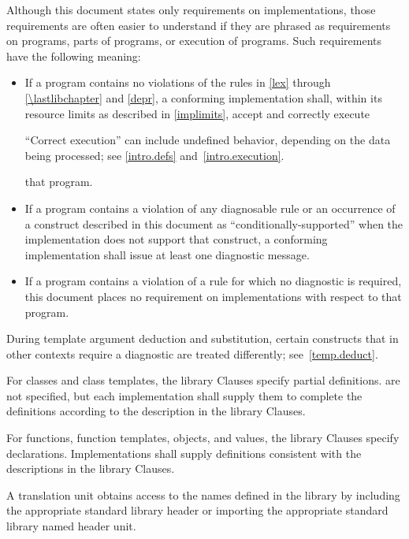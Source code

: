 \pnum
{}%
Although this document states only requirements on \Cpp{}
implementations, those requirements are often easier to understand if
they are phrased as requirements on programs, parts of programs, or
execution of programs. Such requirements have the following meaning:
\begin{itemize}
\item
If a program contains no violations of the rules in
\ref{lex} through \ref{\lastlibchapter} and \ref{depr},
a conforming implementation shall,
within its resource limits as described in \ref{implimits},
accept and correctly execute
\begin{footnote}
``Correct execution'' can include undefined behavior, depending on
the data being processed; see \ref{intro.defs} and~\ref{intro.execution}.
\end{footnote}
that program.
\item
{}%
If a program contains a violation of any diagnosable rule or an occurrence
of a construct described in this document as ``conditionally-supported'' when
the implementation does not support that construct, a conforming implementation
shall issue at least one diagnostic message.
\item
{}%
If a program contains a violation of a rule for which no diagnostic
is required, this document places no requirement on
implementations with respect to that program.
\end{itemize}
\begin{note}
During template argument deduction and substitution,
certain constructs that in other contexts require a diagnostic
are treated differently;
see~\ref{temp.deduct}.
\end{note}

\pnum
{}%
%
%
For classes and class templates, the library Clauses specify partial
definitions.  are not
specified, but each implementation shall supply them to complete the
definitions according to the description in the library Clauses.

\pnum
For functions, function templates, objects, and values, the library
Clauses specify declarations. Implementations shall supply definitions
consistent with the descriptions in the library Clauses.

\pnum
A \Cpp{}  translation unit
obtains access to the names defined in the library by
including the appropriate standard library header or importing
the appropriate standard library named header unit.

